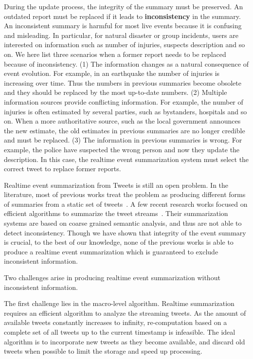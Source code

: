 \documentclass{llncs}
\begin{document}
During the update process, the integrity of the summary must be preserved.  An outdated report must be replaced if it leads to \textbf{inconsistency} in the summary. An inconsistent summary is harmful for most live events because it is confusing and misleading. In particular, for natural disaster or group incidents,  users are interested on  information such as number of injuries, suspects description and so on. We here list three scenarios when a former report needs to be replaced because of inconsistency. (1) The information changes as a natural consequence of event evolution. For example, in an earthquake the number of injuries is increasing over time. Thus the numbers in previous summaries become obsolete and they should be replaced by the most up-to-date numbers. (2) Multiple information sources provide conflicting information. For example, the number of injuries is often estimated by several parties, such as  bystanders, hospitals and so on. When a more authoritative source, such as the local government announces the new estimate, the old estimates in previous summaries are no longer credible and must be replaced. (3) The information in previous summaries is wrong. For example, the police have suspected the wrong person and now they update the description. In this case, the realtime event summarization system must select the correct tweet to replace former reports. 


Realtime event summarization from Tweets is still an open problem. In the literature, most of previous works treat the problem as producing different forms of summaries from a static set of tweets~\cite{}. A few recent research works focused on efficient algorithms to summarize the tweet streams~\cite{}. Their summarization systems are based on coarse grained semantic analysis, and thus are not able to detect inconsistency. Though we have shown that integrity of the event summary is crucial, to the best of our knowledge, none of the previous works is able to produce a realtime event summarization which is guaranteed to exclude inconsistent information.


Two challenges arise in producing realtime event summarization without inconsistent information. 

The first challenge lies in the macro-level algorithm. Realtime summarization requires an efficient algorithm to analyze the streaming tweets. As the amount of available tweets constantly increases to infinity, re-computation based on a complete set of all tweets up to the current timestamp is infeasible. The ideal algorithm is to  incorporate new tweets as they become available, and discard old tweets when possible to limit the storage and speed up processing. 
\end{document}
